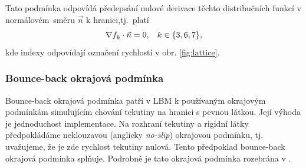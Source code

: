 Tato podmínka odpovídá předepsání nulové derivace těchto distribučních funkcí v normálovém~směru $ \vec{n} $ k hranici,tj.~platí
\begin{equation}
\nabla f^{}_{k} \cdot \vec{n} = 0, \hspace{3mm} k \in \{3, 6, 7\},
\end{equation}
kde indexy odpovídají označení rychlostí v obr. \ref{fig:lattice}.
\subsubsection{\fontsize{12}{15}\selectfont Bounce-back okrajová podmínka}
Bounce-back okrajová podmínka patří v LBM k používaným okrajovým podmínkám simulujícím chování tekutiny na hranici s pevnou látkou. Její výhoda je jednoduchost implementace. Na rozhraní tekutiny a rigidní látky předpokládáme neklouzavou (anglicky \textit{no-slip}) okrajovou podmínku, tj. uvažujeme, že je zde rychlost tekutiny nulová. Tento předpoklad bounce-back okrajová podmínka splňuje. Podrobně je tato okrajová podmínka rozebrána v \cite{Kruger}.

